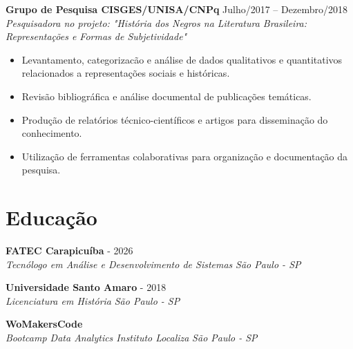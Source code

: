 \documentclass[a4paper,10pt]{article}
\newcommand{\entry}[4]{
  \noindent\textbf{#1} \hfill #2 \\
  \noindent\textit{#3} \hfill \textit{#4} \\
  \vspace{2pt}
}
\begin{document}
\begin{center}
\begin{itemize}
\end{itemize}

\entry{Grupo de Pesquisa CISGES/UNISA/CNPq}{\faCalendar \space 
 Julho/2017 -- Dezembro/2018}{Pesquisadora no projeto: "História dos Negros na Literatura Brasileira: Representações e Formas de Subjetividade"}
\space
\vspace{-1.6em}
\begin{itemize}
\setlength\itemsep{0em}
\item Levantamento, categorizacão e análise de dados qualitativos e quantitativos relacionados a representações sociais e históricas.
\item Revisão bibliográfica e análise documental de publicações temáticas.
\item Produção de relatórios técnico-científicos e artigos para disseminação do conhecimento.
\item Utilização de ferramentas colaborativas para organização e documentação da pesquisa.

\end{itemize}




\section*{Educação}
\vspace{0.6em}

\entry{FATEC Carapicuíba}{\faCalendar {} - 2026}{Tecnólogo em Análise e Desenvolvimento de Sistemas}{\faMapMarker \space São Paulo - SP}

\entry{Universidade Santo Amaro}{\faCalendar {} - 2018}{Licenciatura em História}{\faMapMarker \space São Paulo - SP}

\entry{WoMakersCode}{\faCalendar {}}{Bootcamp Data Analytics Instituto Localiza}{\faMapMarker \space São Paulo - SP}


\end{center}
\end{document}
